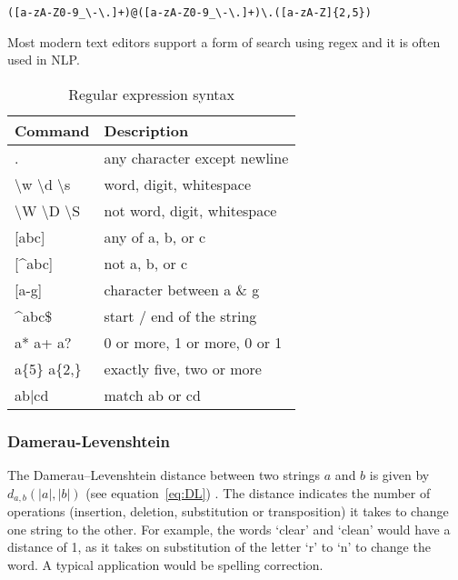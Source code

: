 \begin{verbatim}
([a-zA-Z0-9_\-\.]+)@([a-zA-Z0-9_\-\.]+)\.([a-zA-Z]{2,5})
\end{verbatim}

Most modern text editors support a form of search using regex and it is often used in \ac{NLP}.

\begin{table}[!htbp]
\centering
\caption[Regular expression syntax]{Regular expression syntax}
\label{tab:regex}
\begin{tabu}{ll}
\toprule
\textbf{Command}           & \textbf{Description}         \\ 
\midrule
.                          & any character except newline \\
\textbackslash w \textbackslash d \textbackslash s & word, digit, whitespace      \\
\textbackslash W \textbackslash D \textbackslash S & not word, digit, whitespace  \\
{[}abc{]}                  & any of a, b, or c            \\
{[}\textasciicircum abc{]} & not a, b, or c               \\
{[}a-g{]}                  & character between a \& g     \\
\textasciicircum abc\$     & start / end of the string    \\
a* a+ a?                   & 0 or more, 1 or more, 0 or 1 \\
a\{5\} a\{2,\}             & exactly five, two or more    \\
ab|cd                      & match ab or cd               \\ 
\bottomrule
\end{tabu}
\end{table}


\subsubsection{Damerau-Levenshtein}
\label{s:damlevtech}

The Damerau–Levenshtein distance\marginpar{$\bm{\Sigma}$~\ref{eq:DL}} between two strings $a$ and $b$ is given by $d_{a,b}(|a|,|b|)$ (see equation~\ref{eq:DL}) \autocite{WikipediaA, Damerau1964, Levenshtein1966}. The distance indicates the number of operations (insertion, deletion, substitution or transposition) it takes to change one string to the other. For example, the words `clear' and `clean' would have a distance of 1, as it takes on substitution of the letter `r' to `n' to change the word. A typical application would be spelling correction. 

